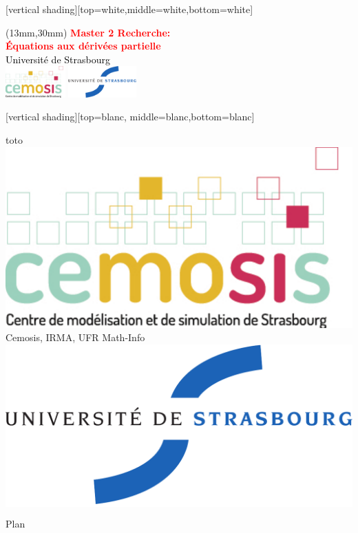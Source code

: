 \documentclass[slideopt,A4]{beamer}
\begin{document}
[vertical shading][top=white,middle=white,bottom=white]



\begin{frame}

\begin{textblock*}{15cm}(13mm,30mm)
{\textcolor{red} {
{\huge\bf Master 2 Recherche: }\\[2mm]
{\bf Équations aux dérivées partielle}\\[8mm] }}
{\textcolor{black} {
	{\Large Université de Strasbourg}\\[2mm]
        \includegraphics[height=1.2cm]{LOGOS/logoCemosis}	\hspace*{40mm}	
        \includegraphics[height=1.2cm]{LOGOS/logoUDS}\\
      }}
\end{textblock*}

\end{frame}



[vertical shading][top=blanc, middle=blanc,bottom=blanc]


{
\begin{beamercolorbox}[wd=1\paperwidth,ht=15.5pt]{toto}
\hspace{-1.6mm}	
  \raisebox{1.2ex}
  {  \includegraphics[height=.6cm]{LOGOS/logoCemosis}}
  \raisebox{2.5ex}
  {Cemosis, IRMA, UFR Math-Info}
\hspace{\fill}	
  \raisebox{2.5ex}
 {  }
  \raisebox{1ex}
{  \colorbox{white}{\includegraphics[height=.6cm]{LOGOS/logoUDS}}}
\end{beamercolorbox} 
}

%
%

\begin{frame}{{\Large Plan}}
  \tableofcontents
\end{frame}
\end{document}
